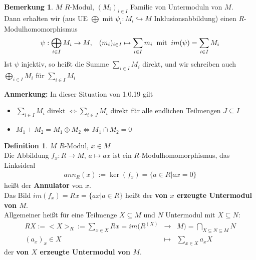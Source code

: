\documentclass[10pt,a4paper,numbers=endperiod]{scrreprt}
\theoremstyle{definition}
\newtheorem{defi}[satz]{Definition}
\newtheorem{bem}[satz]{Bemerkung}
\begin{document}
\begin{bem}
	$M$ $R$-Modul, $(M_i)_{i \in I}$ Familie von Untermoduln von $M$.\\
	Dann erhalten wir (aus UE $\bigoplus$ mit $\psi_i: M_i \hookrightarrow M$ Inklusionsabbildung) einen $R$-Modulhomomorphismus
	\begin{align*}
		\psi: \bigoplus\limits_{i \in I} M_i \rightarrow M, \hspace{3mm} (m_i)_{i \in I} \mapsto \sum\limits_{i \in I} m_i \hspace{2mm} \text{mit} \hspace{2mm} im(\psi) = \sum\limits_{i \in I} M_i
	\end{align*}
	Ist $\psi$ injektiv, so heißt die Summe $\sum\limits_{i \in I} M_i$ direkt, und wir schreiben auch $\bigoplus\limits_{i \in I} M_i$ für $\sum_{i \in I} M_i$
\end{bem}

\textbf{Anmerkung:} In dieser Situation von 1.0.19 gilt
\begin{itemize}
	\item $\sum\limits_{i \in I} M_i$ direkt $\Leftrightarrow \sum\limits_{i \in J} M_i$ direkt für alle endlichen Teilmengen $J \subseteq I$
	\item $M_1 + M_2 = M_1 \oplus M_2 \Leftrightarrow M_1 \cap M_2 = 0$
\end{itemize}

\begin{defi}
	$M$ $R$-Modul, $x \in M$\\
	Die Abbildung $f_x: R \rightarrow M$, $a \mapsto ax$ ist ein $R$-Modulhomomorphismus, das Linksideal
	\begin{align*}
	ann_R(x) := \ker(f_x) = \{a \in R| ax = 0\}
	\end{align*}
	heißt der \textbf{Annulator} von $x$.\\
	Das Bild $im(f_x) = Rx = \{ax| a \in R\}$ heißt der \textbf{von $x$ erzeugte Untermodul von $M$}.\\
	Allgemeiner heißt für eine Teilmenge $X \subseteq M$ und $N$ Untermodul mit $X \subseteq N$:
	\begin{eqnarray*}
		 RX := <X>_R := \sum\limits_{x \in X} Rx = im(R^{(X)} &\rightarrow& M) = \bigcap\limits_{X \subseteq N \subseteq M} N\\
		 (a_x)_x \in X &\mapsto& \sum_{x \in X} a_x X 
	\end{eqnarray*}
	der \textbf{von $X$ erzeugte Untermodul von $M$}.
\end{defi}
\end{document}

